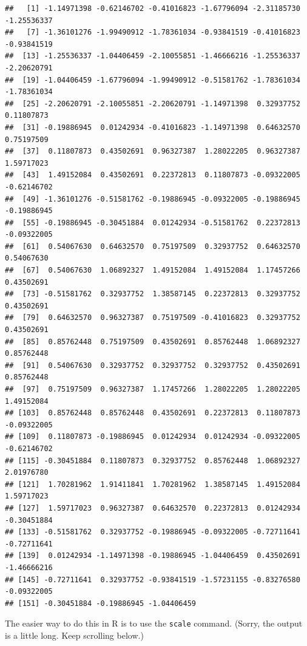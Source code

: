 \documentclass[
]{book}
\newenvironment{Shaded}{\begin{snugshade}}{\end{snugshade}}
\newcommand{\FunctionTok}[1]{\textcolor[rgb]{0.00,0.00,0.00}{#1}}
\newcommand{\NormalTok}[1]{#1}
\newcommand{\SpecialCharTok}[1]{\textcolor[rgb]{0.00,0.00,0.00}{#1}}
\begin{document}
\begin{verbatim}
##   [1] -1.14971398 -0.62146702 -0.41016823 -1.67796094 -2.31185730 -1.25536337
##   [7] -1.36101276 -1.99490912 -1.78361034 -0.93841519 -0.41016823 -0.93841519
##  [13] -1.25536337 -1.04406459 -2.10055851 -1.46666216 -1.25536337 -2.20620791
##  [19] -1.04406459 -1.67796094 -1.99490912 -0.51581762 -1.78361034 -1.78361034
##  [25] -2.20620791 -2.10055851 -2.20620791 -1.14971398  0.32937752  0.11807873
##  [31] -0.19886945  0.01242934 -0.41016823 -1.14971398  0.64632570  0.75197509
##  [37]  0.11807873  0.43502691  0.96327387  1.28022205  0.96327387  1.59717023
##  [43]  1.49152084  0.43502691  0.22372813  0.11807873 -0.09322005 -0.62146702
##  [49] -1.36101276 -0.51581762 -0.19886945 -0.09322005 -0.19886945 -0.19886945
##  [55] -0.19886945 -0.30451884  0.01242934 -0.51581762  0.22372813 -0.09322005
##  [61]  0.54067630  0.64632570  0.75197509  0.32937752  0.64632570  0.54067630
##  [67]  0.54067630  1.06892327  1.49152084  1.49152084  1.17457266  0.43502691
##  [73] -0.51581762  0.32937752  1.38587145  0.22372813  0.32937752  0.43502691
##  [79]  0.64632570  0.96327387  0.75197509 -0.41016823  0.32937752  0.43502691
##  [85]  0.85762448  0.75197509  0.43502691  0.85762448  1.06892327  0.85762448
##  [91]  0.54067630  0.32937752  0.32937752  0.32937752  0.43502691  0.85762448
##  [97]  0.75197509  0.96327387  1.17457266  1.28022205  1.28022205  1.49152084
## [103]  0.85762448  0.85762448  0.43502691  0.22372813  0.11807873 -0.09322005
## [109]  0.11807873 -0.19886945  0.01242934  0.01242934 -0.09322005 -0.62146702
## [115] -0.30451884  0.11807873  0.32937752  0.85762448  1.06892327  2.01976780
## [121]  1.70281962  1.91411841  1.70281962  1.38587145  1.49152084  1.59717023
## [127]  1.59717023  0.96327387  0.64632570  0.22372813  0.01242934 -0.30451884
## [133] -0.51581762  0.32937752 -0.19886945 -0.09322005 -0.72711641 -0.72711641
## [139]  0.01242934 -1.14971398 -0.19886945 -1.04406459  0.43502691 -1.46666216
## [145] -0.72711641  0.32937752 -0.93841519 -1.57231155 -0.83276580 -0.09322005
## [151] -0.30451884 -0.19886945 -1.04406459
\end{verbatim}

The easier way to do this in R is to use the \texttt{scale} command. (Sorry, the output is a little long. Keep scrolling below.)

\begin{Shaded}
\end{Shaded}
\end{document}
